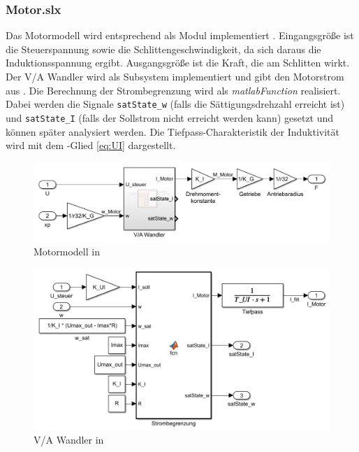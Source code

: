 \subsubsection{Motor.slx}
Das Motormodell wird  entsprechend als Modul implementiert .
Eingangsgröße ist die Steuerspannung sowie die Schlittengeschwindigkeit, da sich daraus die Induktionsspannung ergibt.
Ausgangsgröße ist die Kraft, die am Schlitten wirkt.
Der V/A Wandler wird als Subsystem implementiert und gibt den Motorstrom aus .
Die Berechnung der Strombegrenzung  wird als \emph{matlabFunction} realisiert.
Dabei werden die Signale \texttt{satState\_w} (falls die Sättigungsdrehzahl erreicht ist) und \texttt{satState\_I} (falls der Sollstrom nicht erreicht werden kann) gesetzt und können später analysiert werden.
Die Tiefpass-Charakteristik der Induktivität wird mit dem -Glied \eqref{eq:UI} dargestellt.

\begin{figure}
	\centering
		\includegraphics[scale=0.6]{Bilder/Simulink/motor.PNG}
	\caption{Motormodell in \sm}
	\label{fig:simmot}
\end{figure}

\begin{figure}
	\centering
		\includegraphics[scale=0.5]{Bilder/Simulink/va_wandler.PNG}
	\caption{V/A Wandler in \sm}
	\label{fig:simva}
\end{figure}

